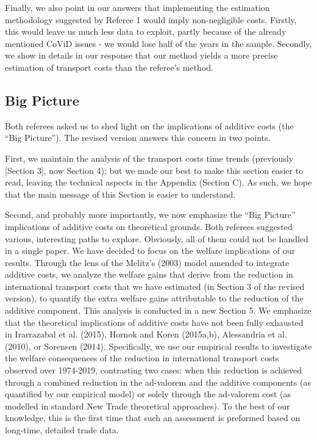 \documentclass[12pt]{article}
\begin{document}
Finally, we also point in our answers that implementing the estimation methodology suggested by Referee 1 would imply non-negligible costs. Firstly, this would leave us much less data to exploit, partly  because of the already mentioned CoViD issues - we would lose half of the years in the sample. Secondly, we show in details in our response that our method yields a more precise estimation of transport costs than the referee's method. \medskip



\subsection{Big Picture}
Both referees asked us to shed light on the implications of additive costs (the ``Big Picture''). The revised version answers this concern in two points. \medskip

First, we maintain the analysis of the transport costs time trends (previously [Section 3], now Section 4); but we made our best to make this section easier to read, leaving the technical aspects in the Appendix (Section C). As such, we hope that the main message of this Section is easier to understand. \medskip

Second, and probably more importantly, we now emphasize the ``Big Picture'' implications of additive costs on theoretical grounds. Both referees suggested various, interesting paths to explore. Obviously, all of them could not be handled in a single paper. We have decided to focus on the welfare implications of our results.  Through the lens of the Melitz's (2003) model amended to integrate additive costs, we analyze the welfare gains that derive from the reduction in international transport costs that we have estimated (in Section 3 of the revised version), to quantify the extra welfare gains attributable to the reduction of the additive component. This analysis is conducted in a new Section 5. We emphasize that the theoretical implications of additive costs have not been fully exhausted in Irarrazabal et al. (2015), Hornok and Koren (2015a,b), Alessandria et al. (2010), or Sorensen (2014). Specifically, we use our empirical results to investigate the welfare consequences of the reduction in international transport costs observed over 1974-2019, contrasting two cases: when this reduction is achieved through a combined reduction in the ad-valorem and the additive components (as quantified by our empirical model) or solely through the ad-valorem cost (as modelled in standard New Trade theoretical approaches). To the best of our knowledge, this is the first time that such an assessment is preformed based on long-time, detailed trade data.
\medskip
\end{document}
